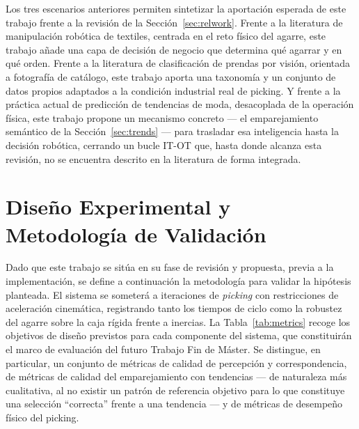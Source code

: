 \documentclass[conference]{IEEEtran}
\begin{document}
Los tres escenarios anteriores permiten sintetizar la aportación esperada de
este trabajo frente a la revisión de la Sección~\ref{sec:relwork}. Frente a
la literatura de manipulación robótica de textiles, centrada en el reto
físico del agarre, este trabajo añade una capa de decisión de negocio que
determina qué agarrar y en qué orden. Frente a la literatura de
clasificación de prendas por visión, orientada a fotografía de catálogo,
este trabajo aporta una taxonomía y un conjunto de datos propios adaptados a
la condición industrial real de picking. Y frente a la práctica actual de
predicción de tendencias de moda, desacoplada de la operación física, este
trabajo propone un mecanismo concreto --- el emparejamiento semántico de la
Sección~\ref{sec:trends} --- para trasladar esa inteligencia hasta la
decisión robótica, cerrando un bucle IT-OT que, hasta donde alcanza esta
revisión, no se encuentra descrito en la literatura de forma integrada.


\section{Diseño Experimental y Metodología de Validación}
\label{sec:metrics}

Dado que este trabajo se sitúa en su fase de revisión y propuesta, previa a
la implementación, se define a continuación la metodología para validar la
hipótesis planteada. El sistema se someterá a iteraciones de \emph{picking}
con restricciones de aceleración cinemática, registrando tanto los tiempos de ciclo
como la robustez del agarre sobre la caja rígida frente a inercias. La Tabla~\ref{tab:metrics} recoge los objetivos de diseño
previstos para cada componente del sistema, que constituirán el marco de
evaluación del futuro Trabajo Fin de Máster. Se distingue, en particular, un
conjunto de métricas de calidad de percepción y correspondencia, de
métricas de calidad del emparejamiento con tendencias --- de naturaleza más
cualitativa, al no existir un patrón de referencia objetivo para lo que
constituye una selección ``correcta'' frente a una tendencia --- y de
métricas de desempeño físico del picking.
\end{document}
